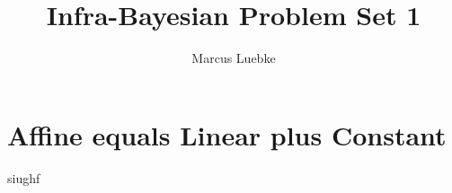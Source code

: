 \documentclass{article}
\title{Infra-Bayesian Problem Set 1}
\author{Marcus Luebke}
\begin{document}
\section{Affine equals Linear plus Constant}
siughf
\end{document}
